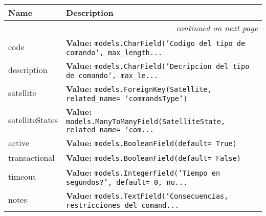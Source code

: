     \vspace{-1cm}
\hspace{\varindent}\begin{longtable}{|p{\varnamewidth}|p{\vardescrwidth}|l}
\cline{1-2}
\cline{1-2} \centering \textbf{Name} & \centering \textbf{Description}& \\
\cline{1-2}
\endhead\cline{1-2}\multicolumn{3}{r}{\small\textit{continued on next page}}\\\endfoot\cline{1-2}
\endlastfoot\raggedright c\-o\-d\-e\- & \raggedright \textbf{Value:} 
{\tt models.CharField('Codigo del tipo de comando', max\_length\texttt{...}}&\\
\cline{1-2}
\raggedright d\-e\-s\-c\-r\-i\-p\-t\-i\-o\-n\- & \raggedright \textbf{Value:} 
{\tt models.CharField('Decripcion del tipo de comando', max\_le\texttt{...}}&\\
\cline{1-2}
\raggedright s\-a\-t\-e\-l\-l\-i\-t\-e\- & \raggedright \textbf{Value:} 
{\tt models.ForeignKey(Satellite, related\_name= 'commandsType')}&\\
\cline{1-2}
\raggedright s\-a\-t\-e\-l\-l\-i\-t\-e\-S\-t\-a\-t\-e\-s\- & \raggedright \textbf{Value:} 
{\tt models.ManyToManyField(SatelliteState, related\_name= 'com\texttt{...}}&\\
\cline{1-2}
\raggedright a\-c\-t\-i\-v\-e\- & \raggedright \textbf{Value:} 
{\tt models.BooleanField(default= True)}&\\
\cline{1-2}
\raggedright t\-r\-a\-n\-s\-a\-c\-t\-i\-o\-n\-a\-l\- & \raggedright \textbf{Value:} 
{\tt models.BooleanField(default= False)}&\\
\cline{1-2}
\raggedright t\-i\-m\-e\-o\-u\-t\- & \raggedright \textbf{Value:} 
{\tt models.IntegerField('Tiempo en segundos?', default= 0, nu\texttt{...}}&\\
\cline{1-2}
\raggedright n\-o\-t\-e\-s\- & \raggedright \textbf{Value:} 
{\tt models.TextField('Consecuencias, restricciones del comand\texttt{...}}&\\
\cline{1-2}
\end{longtable}

